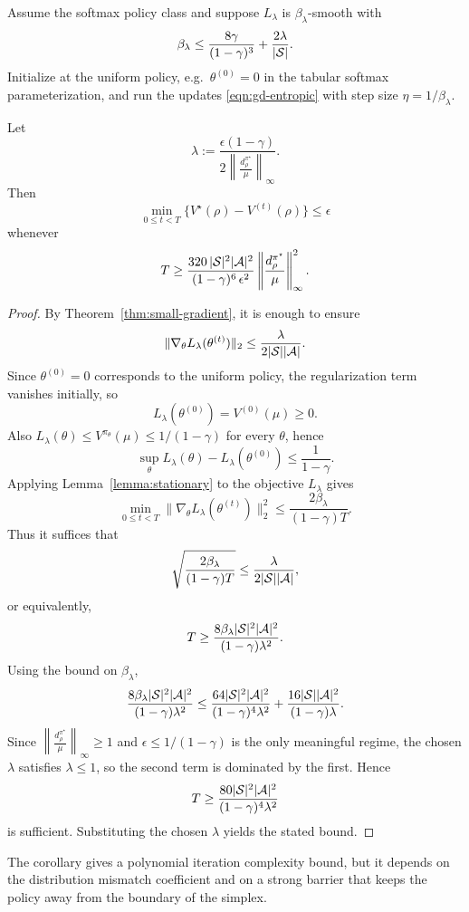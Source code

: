 \begin{corollary}
\label{corollary:entropy}
Assume the softmax policy class and suppose $L_\lambda$ is $\beta_\lambda$-smooth with
\[
\beta_\lambda
\le
\frac{8\gamma}{(1-\gamma)^3}+\frac{2\lambda}{|\mathcal{S}|}.
\]
Initialize at the uniform policy, e.g.\ $\theta^{(0)}=0$ in the tabular softmax parameterization,
and run the updates \eqref{eqn:gd-entropic} with step size $\eta=1/\beta_\lambda$.

Let
\[
\lambda
:=
\frac{\epsilon(1-\gamma)}
{2\left\|\frac{d_\rho^{\pi^\star}}{\mu}\right\|_\infty}.
\]
Then
\[
\min_{0\le t<T}\big\{V^\star(\rho)-V^{(t)}(\rho)\big\}\le \epsilon
\]
whenever
\[
T
\ge
\frac{320\,|\mathcal{S}|^2|\mathcal{A}|^2}{(1-\gamma)^6\,\epsilon^2}
\left\|
\frac{d_\rho^{\pi^\star}}{\mu}
\right\|_\infty^2.
\]
\end{corollary}

\begin{proof}
By Theorem~\ref{thm:small-gradient}, it is enough to ensure
\[
\|\nabla_\theta L_\lambda(\theta^{(t)})\|_2 \le \frac{\lambda}{2|\mathcal{S}||\mathcal{A}|}.
\]
Since $\theta^{(0)}=0$ corresponds to the uniform policy, the regularization term vanishes initially,
so
\[
L_\lambda(\theta^{(0)})=V^{(0)}(\mu)\ge 0.
\]
Also $L_\lambda(\theta)\le V^{\pi_\theta}(\mu)\le 1/(1-\gamma)$ for every $\theta$, hence
\[
\sup_\theta L_\lambda(\theta)-L_\lambda(\theta^{(0)})
\le \frac{1}{1-\gamma}.
\]
Applying Lemma~\ref{lemma:stationary} to the objective $L_\lambda$ gives
\[
\min_{0\le t<T}\|\nabla_\theta L_\lambda(\theta^{(t)})\|_2^2
\le
\frac{2\beta_\lambda}{(1-\gamma)T}.
\]
Thus it suffices that
\[
\sqrt{\frac{2\beta_\lambda}{(1-\gamma)T}}
\le
\frac{\lambda}{2|\mathcal{S}||\mathcal{A}|},
\]
or equivalently,
\[
T\ge \frac{8\beta_\lambda |\mathcal{S}|^2|\mathcal{A}|^2}{(1-\gamma)\lambda^2}.
\]
Using the bound on $\beta_\lambda$,
\[
\frac{8\beta_\lambda |\mathcal{S}|^2|\mathcal{A}|^2}{(1-\gamma)\lambda^2}
\le
\frac{64|\mathcal{S}|^2|\mathcal{A}|^2}{(1-\gamma)^4\lambda^2}
+
\frac{16|\mathcal{S}||\mathcal{A}|^2}{(1-\gamma)\lambda}.
\]
Since $\left\|\frac{d_\rho^{\pi^\star}}{\mu}\right\|_\infty\ge 1$ and
$\epsilon\le 1/(1-\gamma)$ is the only meaningful regime, the chosen $\lambda$ satisfies
$\lambda\le 1$, so the second term is dominated by the first. Hence
\[
T
\ge
\frac{80|\mathcal{S}|^2|\mathcal{A}|^2}{(1-\gamma)^4\lambda^2}
\]
is sufficient. Substituting the chosen $\lambda$ yields the stated bound.
\end{proof}

The corollary gives a polynomial iteration complexity bound, but it depends on the
distribution mismatch coefficient and on a strong barrier that keeps the policy away
from the boundary of the simplex.

